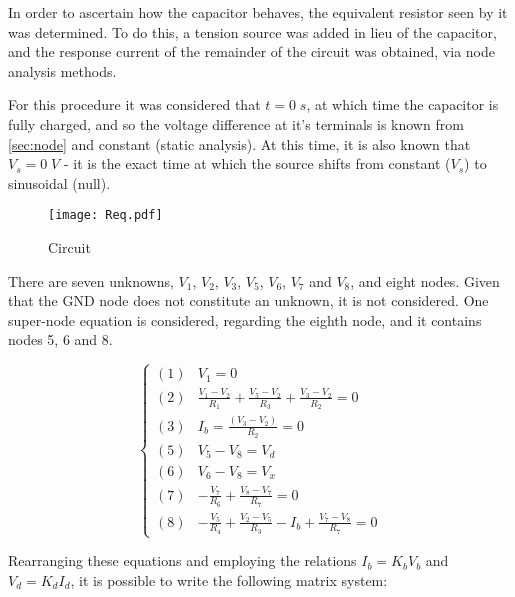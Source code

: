 In order to ascertain how the capacitor behaves, the equivalent resistor seen by it was determined. To do this, a tension source was added in lieu of the capacitor, and the response current of the remainder of the circuit was obtained, via node analysis methods.

For this procedure it was considered that $t=0\;s$, at which time the capacitor is fully charged, and so the voltage difference at it's terminals is known from \ref{sec:node} and constant (static analysis). At this time, it is also known that $V_s=0\;V$ - it is the exact time at which the source shifts from constant ($V_s$) to sinusoidal (null).

\begin{figure}[H]
  \centering
  \texttt{[image: Req.pdf]}
  \caption{Circuit}
  \label{Req_fig}
\end{figure}

There are seven unknowns, $V_1$, $V_2$, $V_3$, $V_5$, $V_6$, $V_7$ and $V_8$, and eight nodes. Given that the GND node does not constitute an unknown, it is not considered. One super-node equation is considered, regarding the eighth node, and it contains nodes 5, 6 and 8.

\begin{equation}
  \begin{cases}
    (1) & V_1=0 \\
    (2) & \frac{V_1-V_2}{R_1} + \frac{V_5-V_2}{R_3} + \frac{V_3-V_2}{R_2} = 0 \\
    (3) & I_b = \frac{(V_3-V_2)}{R_2} = 0 \\
    (5) & V_5-V_8 = V_d \\
    (6) & V_6-V_8 = V_x \\
    (7) & -\frac{V_7}{R_6} + \frac{V_8-V_7}{R_7} = 0 \\
    (8) & -\frac{V_5}{R_4}+\frac{V_2-V_5}{R_3}-I_b+\frac{V_7-V_8}{R_7} = 0
  \end{cases}
\end{equation}

Rearranging these equations and employing the relations $I_b = K_bV_b$ and $V_d = K_dI_d$, it is possible to write the following matrix system:


